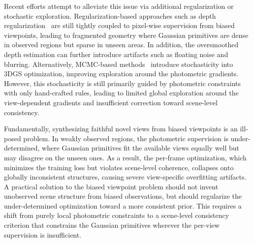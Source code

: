 \documentclass[lettersize,journal]{IEEEtran}
\begin{document}
Recent efforts attempt to alleviate this issue via additional regularization or stochastic exploration. Regularization-based approaches such as depth regularization~\cite{pgsr,hierarchical,mpgs}
are still tightly coupled to pixel-wise supervision from biased viewpoints, 
leading to fragmented geometry where Gaussian primitives are dense in observed regions but sparse in unseen areas.
In addition, the oversmoothed depth estimation can further introduce artifacts such as floating noise and blurring.
Alternatively, MCMC-based methods~\cite{mcmc,mh3dgs} introduce stochasticity into 3DGS optimization,
improving exploration around the photometric gradients.
However, this stochasticity is still primarily guided by photometric constraints with only hand-crafted rules, leading to limited global exploration around the view-dependent gradients and insufficient correction toward scene-level consistency.

Fundamentally, synthesizing faithful novel views from biased viewpoints is an ill-posed problem. 
In weakly observed regions, the photometric supervision is under-determined, where Gaussian primitives fit the available views equally well but may disagree on the unseen ones. As a result, the per-frame optimization, which minimizes the training loss but violates scene-level coherence, collapses onto globally inconsistent structures, causing severe view-specific overfitting artifacts.
A practical solution to the biased viewpoint problem should not invent unobserved scene structure from biased observations, but should regularize the under-determined optimization toward a more consistent prior.
This requires a shift from purely local photometric constraints to a scene-level consistency criterion that constrains the Gaussian primitives wherever the per-view supervision is insufficient.
\end{document}
